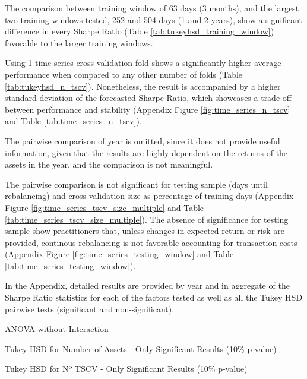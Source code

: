 \documentclass{article}
\begin{document}
The comparison between training window of 63 days (3 months), and the largest two training windows tested, 252 and 504 days (1 and 2 years), show a significant difference in every Sharpe Ratio (Table \ref{tab:tukeyhsd_training_window}) favorable to the larger training windows.

Using 1 time-series cross validation fold shows a significantly higher average performance when compared to any other number of folds (Table \ref{tab:tukeyhsd_n_tscv}). Nonetheless, the result is accompanied by a higher standard deviation of the forecasted Sharpe Ratio, which showcases a trade-off between performance and stability (Appendix Figure \ref{fig:time_series_n_tscv} and Table \ref{tab:time_series_n_tscv}).

The pairwise comparison of year is omitted, since it does not provide useful information, given that the results are highly dependent on the returns of the assets in the year, and the comparison is not meaningful.

The pairwise comparison is not significant for testing sample (days until rebalancing) and cross-validation size as percentage of training days (Appendix Figure \ref{fig:time_series_tscv_size_multiple} and Table \ref{tab:time_series_tscv_size_multiple}). The absence of significance for testing sample show practitioners that, unless changes in expected return or risk are provided, continous rebalancing is not favorable accounting for transaction costs (Appendix Figure \ref{fig:time_series_testing_window} and Table \ref{tab:time_series_testing_window}).

In the Appendix, detailed results are provided by year and in aggregate of the Sharpe Ratio statistics for each of the factors tested as well as all the Tukey HSD pairwise tests (significant and non-significant).

\begin{table}[h!]
    \label{tab:anova_multi_factor}
    \centering
    {\scriptsize
        
    }
    \caption{ANOVA without Interaction}
\end{table}

\begin{table}[h!]
    \label{tab:tukeyhsd_n_assets}
    \centering
    {\scriptsize
        
    }
    \caption{Tukey HSD for Number of Assets - Only Significant Results (10\% p-value)}
\end{table}

\begin{table}[h!]
    \label{tab:tukeyhsd_n_tscv}
    \centering
    {\scriptsize
        
    }
    \caption{Tukey HSD for Nº TSCV - Only Significant Results (10\% p-value)}
\end{table}
\end{document}
